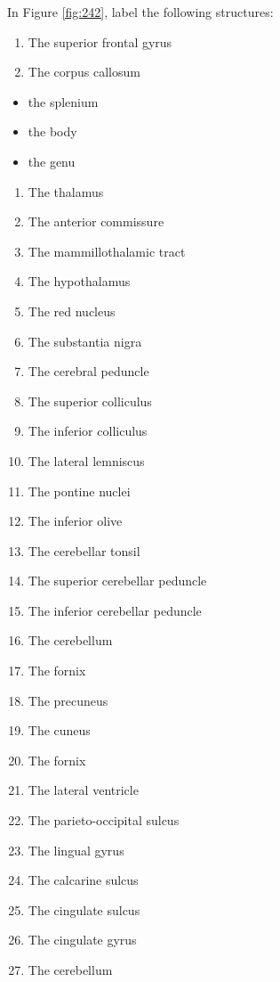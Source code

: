 \documentclass[]{book}
\providecommand{\tightlist}{%
  \setlength{\itemsep}{0pt}\setlength{\parskip}{0pt}}
\begin{document}
In Figure \ref{fig:242}, label the following structures:

\begin{enumerate}
\def\labelenumi{\arabic{enumi}.}
\tightlist
\item
  The superior frontal gyrus
\item
  The corpus callosum
\end{enumerate}

\begin{itemize}
\tightlist
\item
  the splenium
\item
  the body
\item
  the genu
\end{itemize}

\begin{enumerate}
\def\labelenumi{\arabic{enumi}.}
\tightlist
\item
  The thalamus
\item
  The anterior commissure
\item
  The mammillothalamic tract
\item
  The hypothalamus
\item
  The red nucleus
\item
  The substantia nigra
\item
  The cerebral peduncle
\item
  The superior colliculus
\item
  The inferior colliculus
\item
  The lateral lemniscus
\item
  The pontine nuclei
\item
  The inferior olive
\item
  The cerebellar tonsil
\item
  The superior cerebellar peduncle
\item
  The inferior cerebellar peduncle
\item
  The cerebellum
\item
  The fornix
\item
  The precuneus
\item
  The cuneus
\item
  The fornix
\item
  The lateral ventricle
\item
  The parieto-occipital sulcus
\item
  The lingual gyrus
\item
  The calcarine sulcus
\item
  The cingulate sulcus
\item
  The cingulate gyrus
\item
  The cerebellum
\end{enumerate}
\end{document}
